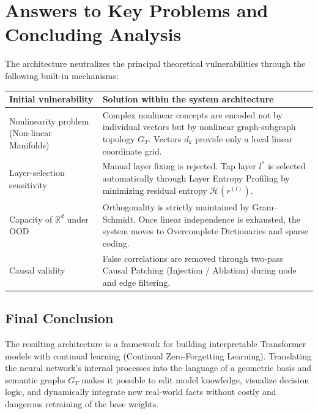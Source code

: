 \documentclass[11pt,a4paper]{article}
\begin{document}
\section{Answers to Key Problems and Concluding Analysis}
The architecture neutralizes the principal theoretical vulnerabilities through the following built-in mechanisms:
\begin{table}[ht]
\centering
\small
\renewcommand{\arraystretch}{1.25}
\begin{tabular}{>{\raggedright\arraybackslash}p{} >{\raggedright\arraybackslash}p{}}
\toprule
\textbf{Initial vulnerability} & \textbf{Solution within the system architecture}\\
\midrule
Nonlinearity problem (Non-linear Manifolds) & Complex nonlinear concepts are encoded not by individual vectors but by nonlinear graph-subgraph topology $G_T$. Vectors $d_k$ provide only a local linear coordinate grid.\\
\addlinespace
Layer-selection sensitivity & Manual layer fixing is rejected. Tap layer $l^*$ is selected automatically through Layer Entropy Profiling by minimizing residual entropy $\mathcal H(r^{(l)})$.\\
\addlinespace
Capacity of $\mathbb R^d$ under OOD & Orthogonality is strictly maintained by Gram--Schmidt. Once linear independence is exhausted, the system moves to Overcomplete Dictionaries and sparse coding.\\
\addlinespace
Causal validity & False correlations are removed through two-pass Causal Patching (Injection / Ablation) during node and edge filtering.\\
\bottomrule
\end{tabular}
\end{table}

\subsection*{Final Conclusion}
The resulting architecture is a framework for building interpretable Transformer models with continual learning (Continual Zero-Forgetting Learning). Translating the neural network's internal processes into the language of a geometric basis and semantic graphs $G_T$ makes it possible to edit model knowledge, visualize decision logic, and dynamically integrate new real-world facts without costly and dangerous retraining of the base weights.
\end{document}
